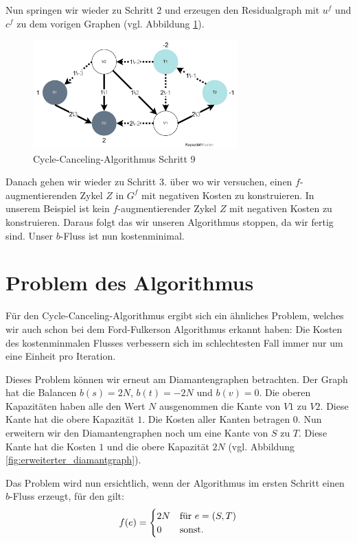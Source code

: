 Nun springen wir wieder zu Schritt 2 und erzeugen den Residualgraph mit $u^f$ und $c^f$ zu dem vorigen Graphen (vgl. Abbildung \ref{fig:cc_step9}).
\begin{figure}[htb]
\centering
\includegraphics[width=0.7\textwidth]{img/leo/graph1-Page-9.drawio.pdf}
\caption{Cycle-Canceling-Algorithmus Schritt 9}
\label{fig:cc_step9}
\end{figure}

Danach gehen wir wieder zu Schritt 3. über wo wir versuchen, einen $f$-augmentierenden Zykel $Z$ in $G^f$ mit negativen Kosten zu konstruieren. In unserem Beispiel ist kein $f$-augmentierender Zykel $Z$ mit negativen Kosten zu konstruieren. Daraus folgt das wir unseren Algorithmus stoppen, da wir fertig sind. Unser $b$-Fluss ist nun kostenminimal.

\section{Problem des Algorithmus}
Für den Cycle-Canceling-Algorithmus ergibt sich ein ähnliches Problem, welches wir auch schon bei dem Ford-Fulkerson Algorithmus erkannt haben: Die Kosten des kostenminmalen Flusses verbessern sich im schlechtesten Fall immer nur um eine Einheit pro Iteration.

Dieses Problem können wir erneut am Diamantengraphen betrachten. Der Graph hat die Balancen $b(s) = 2N$, $b(t) = -2N$ und $b(v) = 0$. Die oberen Kapazitäten haben alle den Wert $N$ ausgenommen die Kante von $V1$ zu $V2$. Diese Kante hat die obere Kapazität $1$. Die Kosten aller Kanten betragen $0$. Nun erweitern wir den Diamantengraphen noch um eine Kante von $S$ zu $T$. Diese Kante hat die Kosten $1$ und die obere Kapazität $2N$ (vgl. Abbildung \ref{fig:erweiterter_diamantgraph}).

Das Problem wird nun ersichtlich, wenn der Algorithmus im ersten Schritt einen $b$-Fluss erzeugt, für den gilt:
\[ f(e) = \begin{cases}
 2N & $für $ e = (S,T) \\
 0 & $sonst.$
\end{cases} \]

